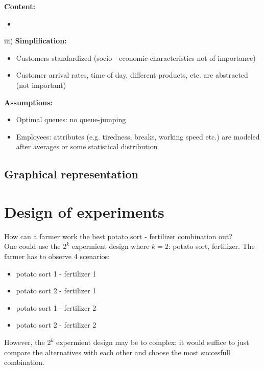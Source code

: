 	\textbf{Content:}
		\begin{itemize}	
		  \item 
		\end{itemize}

iii)
\textbf{Simplification:}
	\begin{itemize}
	  \item Customers standardized (socio - economic-characteristics not of importance)
	  \item Customer arrival rates, time of day, different products, etc. are abstracted (not important)
	\end{itemize}

\textbf{Assumptions:}
	\begin{itemize}
	  \item Optimal queues: no queue-jumping
	  \item Employees: attributes  (e.g. tiredness, breaks, working speed etc.) are modeled after averages or some 
	        statistical distribution
	\end{itemize}




					
\subsection{Graphical representation}
 

\section{Design of experiments}
How can a farmer work the best potato sort - fertilizer combination out?\\
One could use the $2^k $ expermient design where $k=2$: potato sort, fertilizer.
The farmer has to observe 4 scenarios:
\begin{itemize}
 \item potato sort 1 - fertilizer 1
\item potato sort 2 - fertilizer 1
\item potato sort 1 - fertilizer 2
\item potato sort 2 - fertilizer 2
\end{itemize}
However, the $2^k$ expermient design may be to complex; it would suffice to just compare the alternatives with
each other and choose the most succesfull combination.   